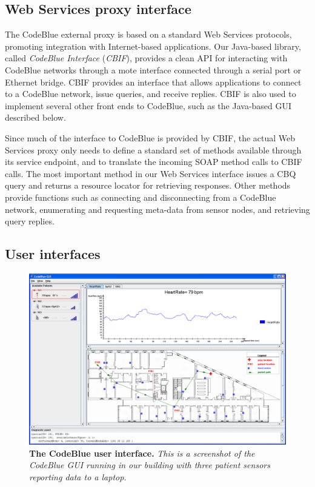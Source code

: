 \subsection{Web Services proxy interface}

The CodeBlue external proxy is based on a standard Web Services
protocols, promoting integration with Internet-based applications.
Our Java-based library, called {\em CodeBlue Interface}
({\em CBIF}), provides a clean API for interacting with CodeBlue
networks through a mote interface connected through a serial port or
Ethernet bridge.  CBIF provides an interface that allows applications
to connect to a CodeBlue network, issue queries, and receive
replies. CBIF is also used to implement several other front ends to
CodeBlue, such as the Java-based GUI described below.

Since much of the interface to CodeBlue is provided by CBIF, the
actual Web Services proxy only needs to define a standard set of
methods available through its service endpoint, and to translate the
incoming SOAP method calls to CBIF calls.
The most important method in our Web Services interface issues a CBQ
query and returns a resource locator for retrieving responses. 
Other methods provide functions such as connecting and
disconnecting from a CodeBlue network, enumerating and requesting
meta-data from sensor nodes, and retrieving query replies. 


\subsection{User interfaces}

\begin{figure}[t] 
\begin{center}
\includegraphics[width=0.6\hsize]{./resources/codeblue-nsdi06/figures/codeBlueGUI.png}
\end{center}
\caption{{\small {\bf The CodeBlue user interface.} 
{\em This is a screenshot of the CodeBlue GUI running in our 
building with three patient sensors reporting data to a laptop.}}}
\label{fig-codeBlueGUI}
\end{figure}

